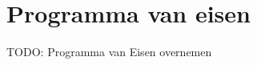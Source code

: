    
\section{Programma van eisen} %

{\par \bigskip \par \color{red} TODO: Programma van Eisen overnemen \par \bigskip \par }